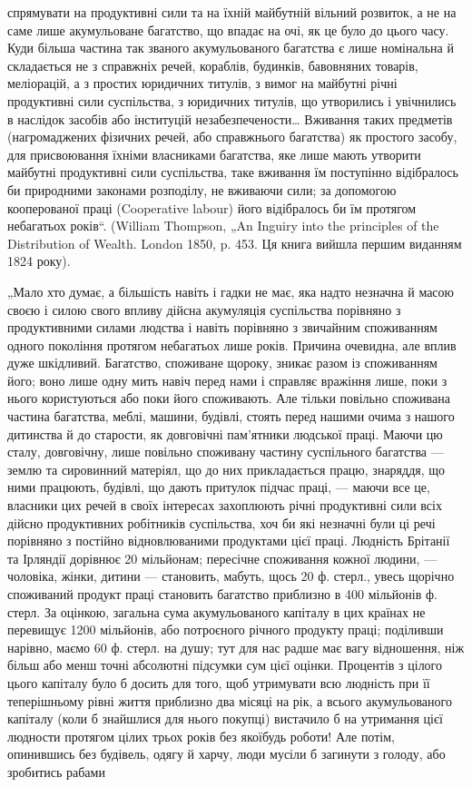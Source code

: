 \parcont{}  %
спрямувати на продуктивні сили та на їхній майбутній вільний розвиток,
а не на саме лише акумульоване багатство, що впадає на очі, як це
було до цього часу. Куди більша частина так званого акумульованого
багатства є лише номінальна й складається не з справжніх речей, кораблів,
будинків, бавовняних товарів, меліорацій, а з простих юридичних
титулів, з вимог на майбутні річні продуктивні сили суспільства, з юридичних
титулів, що утворились і увічнились в наслідок засобів або
інституцій незабезпечености\dots{} Вживання таких предметів (нагромаджених
фізичних речей, або справжнього багатства) як простого
засобу, для присвоювання їхніми власниками багатства, яке лише мають
утворити майбутні продуктивні сили суспільства, таке вживання їм поступінно
відібралось би природними законами розподілу, не вживаючи
сили; за допомогою кооперованої праці (Cooperative labour) його
відібралось би їм протягом небагатьох років“. (William Thompson, „An
Inguiry into the principles of the Distribution of Wealth. London 1850, p. 453.
Ця книга вийшла першим виданням 1824 року).

„Мало хто думає, а більшість навіть і гадки не має, яка надто
незначна й масою своєю і силою свого впливу дійсна акумуляція суспільства
порівняно з продуктивними силами людства і навіть порівняно
з звичайним споживанням одного покоління протягом небагатьох лише
років. Причина очевидна, але вплив дуже шкідливий. Багатство, споживане
щороку, зникає разом із споживанням його; воно лише одну мить
навіч перед нами і справляє вражіння лише, поки з нього користуються
або поки його споживають. Але тільки повільно споживана частина
багатства, меблі, машини, будівлі, стоять перед нашими очима з нашого
дитинства й до старости, як довговічні пам’ятники людської праці.
Маючи цю сталу, довговічну, лише повільно споживану частину суспільного
багатства — землю та сировинний матеріял, що до них прикладається
працю, знаряддя, що ними працюють, будівлі, що дають притулок підчас
праці, — маючи все це, власники цих речей в своїх інтересах захоплюють
річні продуктивні сили всіх дійсно продуктивних робітників суспільства,
хоч би які незначні були ці речі порівняно з постійно відновлюваними
продуктами цієї праці. Людність Брітанії та Ірляндії дорівнює 20 мільйонам;
пересічне споживання кожної людини, — чоловіка, жінки, дитини —
становить, мабуть, щось 20 ф. стерл., увесь щорічно споживаний продукт
праці становить багатство приблизно в 400 мільйонів ф. стерл. За оцінкою,
загальна сума акумульованого капіталу в цих країнах не перевищує
1200 мільйонів, або потроєного річного продукту праці; поділивши
нарівно, маємо 60 ф. стерл. на душу; тут для нас радше має вагу відношення,
ніж більш або менш точні абсолютні підсумки сум цієї оцінки.
Процентів з цілого цього капіталу було б досить для того, щоб утримувати
всю людність при її теперішньому рівні життя приблизно два
місяці на рік, а всього акумульованого капіталу (коли б знайшлися для
нього покупці) вистачило б на утримання цієї людности протягом цілих
трьох років без якоїбудь роботи! Але потім, опинившись без будівель,
одягу й харчу, люди мусіли б загинути з голоду, або зробитись рабами
\parbreak{}  %
